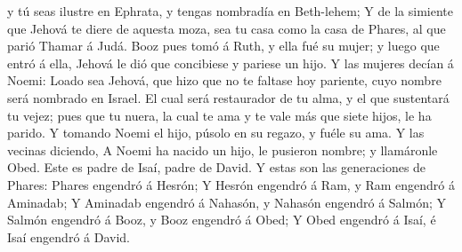 y tú seas ilustre en Ephrata, y tengas nombradía en Beth-lehem;
 Y de la simiente que Jehová te diere de aquesta moza, sea
tu casa como la casa de Phares, al que parió Thamar á Judá.
 Booz pues tomó á Ruth, y ella fué su mujer; y luego que
entró á ella, Jehová le dió que concibiese y pariese un hijo.
 Y las mujeres decían á Noemi: Loado sea Jehová, que hizo
que no te faltase hoy pariente, cuyo nombre será nombrado en Israel.
 El cual será restaurador de tu alma, y el que sustentará
tu vejez; pues que tu nuera, la cual te ama y te vale más que siete
hijos, le ha parido.  Y tomando Noemi el hijo, púsolo en su
regazo, y fuéle su ama.  Y las vecinas diciendo, A Noemi ha
nacido un hijo, le pusieron nombre; y llamáronle Obed. Este es padre de
Isaí, padre de David.  Y estas son las generaciones de
Phares: Phares engendró á Hesrón;  Y Hesrón engendró á Ram,
y Ram engendró á Aminadab;  Y Aminadab engendró á Nahasón,
y Nahasón engendró á Salmón;  Y Salmón engendró á Booz, y
Booz engendró á Obed;  Y Obed engendró á Isaí, é Isaí
engendró á David.

